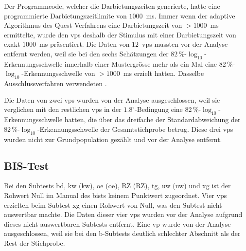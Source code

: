 \documentclass[11pt, twoside, a4paper]{book}		%
\begin{document}
Der Programmcode, welcher die Darbietungszeiten generierte, hatte eine programmierte Darbietungszeitlimite von $1000$~ms. Immer wenn der adaptive Algorithmus des Quest-Verfahrens \citep{Watson1983} eine Darbietungszeit von $> 1000$~ms ermittelte, wurde den \glspl{vp} deshalb der Stimulus mit einer Darbietungszeit von exakt $1000$~ms präsentiert. 
Die Daten von $12$~\glspl{vp} mussten vor der Analyse entfernt werden, weil sie bei den sechs Schätzungen der $82\,\%$-$\log_{10}$-Er\-ken\-nungs\-schwel\-le innerhalb einer Mustergrösse mehr als ein Mal eine $82\,\%$-$\log_{10}$-Er\-ken\-nungs\-schwel\-le von $> 1000$~ms erzielt hatten. Dasselbe Ausschlussverfahren verwendeten \citet{Melnick2013}.

Die Daten von zwei \glspl{vp} wurden von der Analyse ausgeschlossen, weil sie verglichen mit den restlichen \glspl{vp} in der $1.8^{\circ}$-Be\-ding\-ung eine  $82\,\%$-$\log_{10}$-Er\-ken\-nungs\-schwel\-le hatten, die über das dreifache der Standardabweichung der $82\,\%$-$\log_{10}$-Er\-ken\-nungs\-schwel\-le der Gesamtstichprobe betrug. Diese drei \glspl{vp} wurden nicht zur Grundpopulation gezählt und vor der Analyse entfernt.

\subsection*{BIS-Test}
Bei den Subtests \gls{bd}, \acrlong{kw} (\gls{kw}), \acrlong{oe} (\gls{oe}), \acrlong{RZ} (\gls{RZ}), \gls{tg}, \acrlong{uw} (\gls{uw}) und \gls{xg} ist der Rohwert Null im Manual des \gls{bist}s \citep{Jaeger1997} keinem Punktwert zugeordnet. Vier \glspl{vp} erzielten beim Subtest \gls{xg} einen Rohwert von Null, was den Subtest nicht auswertbar machte. Die Daten dieser vier \glspl{vp} wurden vor der Analyse aufgrund dieses nicht auswertbaren Subtests entfernt. Eine \gls{vp} wurde von der Analyse ausgeschlossen, weil sie bei den \gls{b}-Subtests deutlich schlechter Abschnitt als der Rest der Stichprobe.

\vspace{1cm}
\end{document}
